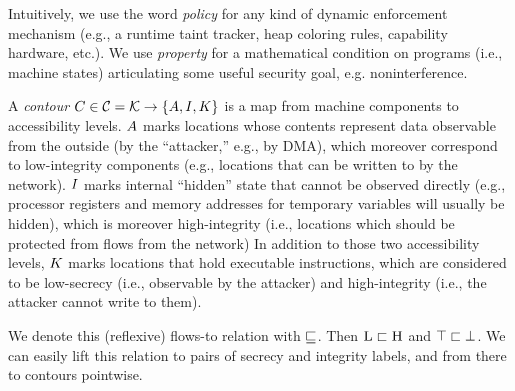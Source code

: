 \documentclass[conference]{IEEEtran}
\begin{document}
\iftext
Intuitively, we use the word {\em policy} for any kind of dynamic
enforcement mechanism (e.g., a runtime taint tracker, heap coloring rules,
capability hardware, etc.).
We use {\em property} for a mathematical
condition on programs (i.e., machine states) articulating some useful
security goal, e.g. noninterference.
\fi

A {\em contour} $C \in {\mathcal C} = {\mathcal K} \rightarrow \{A,
I, K\}$ is a map from machine components to accessibility levels.
$A$ marks locations whose contents represent data observable from the
outside (by the ``attacker,'' e.g., by DMA), which moreover correspond to
low-integrity components (e.g., locations that can be written to \iftext
{} \fi by the network). $I$ marks internal
``hidden'' state that cannot be observed directly (e.g., processor registers and
memory addresses for temporary variables will usually be hidden), which is
moreover high-integrity (i.e., locations which should be protected from flows
from the network)
%
%
In addition to those two accessibility levels, $K$ marks locations that
hold executable instructions, which are considered to be low-secrecy (i.e.,
observable by the attacker) and high-integrity (i.e., the attacker cannot write
to them).


%
We denote this (reflexive) flows-to relation with $\sqsubseteq$. Then
$\textsc{L} \sqsubset \textsc{H}$ and $\top \sqsubset
\bot$. We can easily lift this relation to pairs of secrecy and
integrity labels, and from there to contours pointwise.
\end{document}
